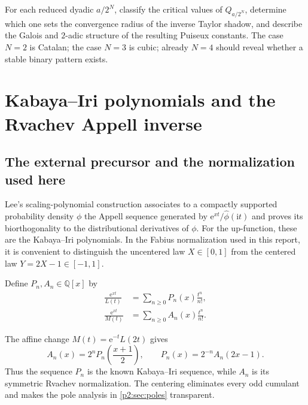 \documentclass[11pt,oneside]{article}
\numberwithin{equation}{section}
\theoremstyle{definition}
\theoremstyle{remark}
\newcommand{\Q}{\mathbb Q}
\newcommand{\e}{\mathrm e}
\newcommand{\ii}{\mathrm i}
\begin{document}
\begin{frontierbox}
For each reduced dyadic $a/2^N$, classify the critical values of $Q_{a/2^N}$, determine which one
sets the convergence radius of the inverse Taylor shadow, and describe the Galois and $2$-adic
structure of the resulting Puiseux constants.  The case $N=2$ is Catalan; the case $N=3$ is cubic;
already $N=4$ should reveal whether a stable binary pattern exists.
\end{frontierbox}

\section{Kabaya--Iri polynomials and the Rvachev Appell inverse}
\label{p2:sec:appell}

\subsection{The external precursor and the normalization used here}

Lee's scaling-polynomial construction associates to a compactly supported probability density
$\phi$ the Appell sequence generated by $\e^{xt}/\widehat\phi(\ii t)$ and proves its biorthogonality
to the distributional derivatives of $\phi$.  For the up-function, these are the Kabaya--Iri
polynomials.  In the Fabius normalization used in this report, it is convenient to distinguish the
uncentered law $X\in[0,1]$ from the centered law $Y=2X-1\in[-1,1]$.

\begin{definition}
\label{p2:def:Appell-polys}
Define $P_n,A_n\in\Q[x]$ by
\begin{align}
 \frac{\e^{xt}}{L(t)}
 &=\sum_{n\ge0}P_n(x)\frac{t^n}{n!},
 \label{p2:eq:P-generating}\\
 \frac{\e^{xt}}{M(t)}
 &=\sum_{n\ge0}A_n(x)\frac{t^n}{n!}.
 \label{p2:eq:A-generating}
\end{align}
\end{definition}

The affine change $M(t)=\e^{-t}L(2t)$ gives
\begin{equation}
 \boxed{
 A_n(x)=2^nP_n\!\left(\frac{x+1}{2}\right),
 \qquad
 P_n(x)=2^{-n}A_n(2x-1).
 }
 \label{p2:eq:A-P-affine}
\end{equation}
Thus the sequence $P_n$ is the known Kabaya--Iri sequence, while $A_n$ is its symmetric Rvachev
normalization.  The centering eliminates every odd cumulant and makes the pole analysis in
\cref{p2:sec:poles} transparent.
\end{document}
